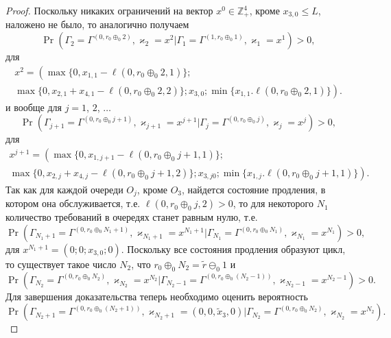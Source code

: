 \documentclass[a4paper,12pt,russian]{extarticle}
\begin{document}
\begin{proof}
Поскольку никаких ограничений на вектор $x^0 \in \mathbb{Z}_+^4$, кроме $x_{3,0}\leqslant L$, наложено не было, то аналогично получаем
\begin{equation*}
\Pr (\Gamma_{2}=\Gamma^{(0,r_0\oplus_{0}2)},\varkappa_{2}=x^2 | \Gamma_{1}=\Gamma^{(1,r_0\oplus_{0}1)},\varkappa_1=x^1) > 0,
\end{equation*}
для 
\begin{multline*}
x^2  =\left(\max{\{0, x_{1,1} - \ell(0,r_0\oplus_{0}2,1)\}}; \right. \\
\left. \max{\{0, x_{2,1} + x_{4,1}  - \ell(0,r_0\oplus_{0}2,2)\}}; x_{3,0};\min{\{x_{1,1}. \ell(0,r_0\oplus_{0}2,1)\}}\right).
\end{multline*}
и вообще для $j = 1$, $2$, $\ldots$
\begin{equation*}
\Pr (\Gamma_{j+1}=\Gamma^{(0,r_0\oplus_{0}j+1)},\varkappa_{j+1}=x^{j+1} | \Gamma_{j}=\Gamma^{(0,r_0\oplus_{0}j)},\varkappa_j=x^j) > 0,
\end{equation*}
для 
\begin{multline*}
x^{j+1}  =\left(\max{\{0, x_{1,j+1} - \ell(0,r_0\oplus_{0}j+1,1)\}}; \right. \\
\left. \max{\{0, x_{2,j} + x_{4,j}  - \ell(0,r_0\oplus_{0}j+1,2)\}}; x_{3,j0};\min{\{x_{1,j}. \ell(0,r_0\oplus_{0}j+1,1)\}}\right).
\end{multline*}
Так как для каждой очереди $O_j$, кроме $O_3$, найдется состояние продления, в котором она обслуживается, т.е. $\ell(0,r_0\oplus_{0}j,2)>0$, то для некоторого $N_1$ количество требований в очередях станет равным нулю, т.е. 
\begin{equation*}
\Pr (\Gamma_{N_1+1}=\Gamma^{(0,r_0\oplus_{0}N_1+1)},\varkappa_{N_1+1}=x^{N_1+1} | \Gamma_{N_1}=\Gamma^{(0,r_0\oplus_{0}N_1)},\varkappa_{N_1}=x^{N_1}) > 0,
\end{equation*}
для $x^{N_1+1}  =\left(0;0; x_{3,0};0\right)$. Поскольку все состояния продления образуют цикл, то существует такое число $N_2$, что $r_0 \oplus_0  N_2 = \tilde{r} \ominus_0 1$ и 
\begin{equation*}
\Pr (\Gamma_{N_2}=\Gamma^{(0,r_0\oplus_{0}N_2)},\varkappa_{N_2}=x^{N_2} | \Gamma_{N_2-1}=\Gamma^{(0,r_0\oplus_{0}(N_2-1))},\varkappa_{N_2-1}=x^{N_2-1}) > 0.
\end{equation*}
Для завершения доказательства теперь необходимо оценить вероятность 
\begin{equation*}
\Pr (\Gamma_{N_2+1}=\Gamma^{(0,r_0\oplus_{0}(N_2 + 1))},\varkappa_{N_2+1}=(0,0,\tilde{x}_3,0) | \Gamma_{N_2}=\Gamma^{(0,r_0\oplus_{0}N_2)},\varkappa_{N_2}=x^{N_2}).
\end{equation*}


\end{proof}
\end{document}
